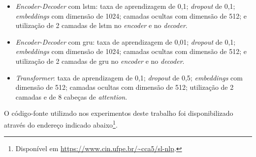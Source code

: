 

\begin{itemize}
    \item \textit{Encoder-Decoder} com \acrshort{lstm}: taxa de aprendizagem de 0,1; \textit{dropout} de 0,1; \textit{embeddings} com dimensão de 1024; camadas ocultas com dimensão de 512; e utilização de 2 camadas de \acrshort{lstm} no \textit{encoder} e no \textit{decoder}.

    \item \textit{Encoder-Decoder} com \acrshort{gru}: taxa de aprendizagem de 0,01; \textit{dropout} de 0,1; \textit{embeddings} com dimensão de 1024; camadas ocultas com dimensão de 512; e utilização de 2 camadas de \acrshort{gru} no \textit{encoder} e no \textit{decoder}.

    \item \textit{Transformer}: taxa de aprendizagem de 0,1; \textit{dropout} de 0,5; \textit{embeddings} com dimensão de 512; camadas ocultas com dimensão de 512; utilização de 2 camadas e de 8 cabeças de \textit{attention}.
\end{itemize}



O código-fonte utilizado nos experimentos deste trabalho foi disponibilizado através do endereço indicado abaixo\footnote{
    Disponível em \url{https://www.cin.ufpe.br/~cca5/sl-nlp}.
}.
